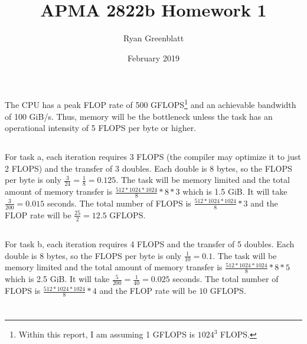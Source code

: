 \documentclass{article}
\title{APMA 2822b Homework 1}
\author{Ryan Greenblatt}
\date{February 2019}
\begin{document}
\setlength\parindent{0pt}

\renewcommand{\thesubsection}{\alph{subsection}}

\maketitle


\section{}

The CPU has a peak FLOP rate of 500 GFLOPS\footnote{Within this report, I am assuming
1 GFLOPS is $1024^3$ FLOPS.} and 
an achievable bandwidth of 100 GiB/s. Thus, memory will
be the bottleneck unless the task has an operational intensity of 5 FLOPS per byte or higher.

\subsection{}

For task a, each iteration requires 3 FLOPS (the compiler may optimize it to just 2 FLOPS) and the transfer 
of 3 doubles.
Each double is 8 bytes, so the FLOPS per byte is only $\frac{3}{24} = \frac{1}{8} = 0.125$. The task will 
be memory limited and
the total amount of memory transfer is $\frac{512*1024*1024}{8} * 8 * 3$ which is 1.5 GiB.
It will take $\frac{3}{200} = 0.015$ seconds. The total number of FLOPS is $\frac{512*1024*1024}{8} * 3$ 
and the FLOP rate  will be $\frac{25}{2} = 12.5$ GFLOPS.


\subsection{}

For task b, each iteration requires 4 FLOPS and the transfer of 5 doubles.
Each double is 8 bytes, so the FLOPS per byte is only $\frac{1}{10} = 0.1$. The task will be memory 
limited and
the total amount of memory transfer is $\frac{512*1024*1024}{8} * 8 * 5$ which is 2.5 GiB.
It will take $\frac{5}{200} = \frac{1}{40} = 0.025$ seconds. The total number of FLOPS 
is $\frac{512*1024*1024}{8} * 4$ and the
FLOP rate will be $10$ GFLOPS.

\section{}
\end{document}
